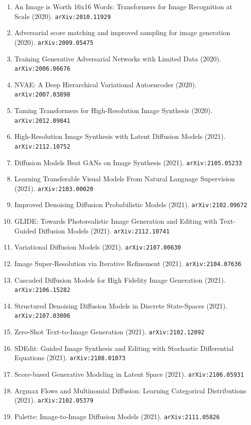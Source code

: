 \documentclass[11pt]{article}
\begin{document}
\begin{enumerate}
  \item An Image is Worth 16x16 Words: Transformers for Image Recognition at
  Scale (2020). \texttt{arXiv:2010.11929}
  \item Adversarial score matching and improved sampling for image generation (2020). \texttt{arXiv:2009.05475}
  \item Training Generative Adversarial Networks with Limited Data (2020). \texttt{arXiv:2006.06676}
  \item NVAE: A Deep Hierarchical Variational Autoencoder (2020). \texttt{arXiv:2007.03898}
  \item Taming Transformers for High-Resolution Image Synthesis (2020). \texttt{arXiv:2012.09841}
  \item High-Resolution Image Synthesis with Latent Diffusion Models (2021). \texttt{arXiv:2112.10752}
  \item Diffusion Models Beat GANs on Image Synthesis (2021). \texttt{arXiv:2105.05233}
  \item Learning Transferable Visual Models From Natural Language Supervision (2021). \texttt{arXiv:2103.00020}
  \item Improved Denoising Diffusion Probabilistic Models (2021). \texttt{arXiv:2102.09672}
  \item GLIDE: Towards Photorealistic Image Generation and Editing with
  Text-Guided Diffusion Models (2021). \texttt{arXiv:2112.10741}
  \item Variational Diffusion Models (2021). \texttt{arXiv:2107.00630}
  \item Image Super-Resolution via Iterative Refinement (2021). \texttt{arXiv:2104.07636}
  \item Cascaded Diffusion Models for High Fidelity Image Generation (2021). \texttt{arXiv:2106.15282}
  \item Structured Denoising Diffusion Models in Discrete State-Spaces (2021). \texttt{arXiv:2107.03006}
  \item Zero-Shot Text-to-Image Generation (2021). \texttt{arXiv:2102.12092}
  \item SDEdit: Guided Image Synthesis and Editing with Stochastic Differential
  Equations (2021). \texttt{arXiv:2108.01073}
  \item Score-based Generative Modeling in Latent Space (2021). \texttt{arXiv:2106.05931}
  \item Argmax Flows and Multinomial Diffusion: Learning Categorical
  Distributions (2021). \texttt{arXiv:2102.05379}
  \item Palette: Image-to-Image Diffusion Models (2021). \texttt{arXiv:2111.05826}

\end{enumerate}
\end{document}
